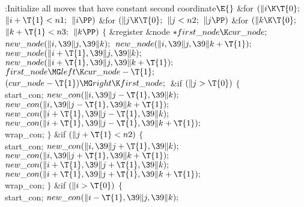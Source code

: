 \B{}:Initialize all moves that have constant second
coordinate\X${}\E{}$\6
\&{for} ${}(\|i\K\T{0};{}$ ${}\|i+\T{1}<\\{n1};{}$ ${}\|i\PP){}$\1\6
\&{for} ${}(\|j\K\T{0};{}$ ${}\|j<\\{n2};{}$ ${}\|j\PP){}$\1\6
\&{for} ${}(\|k\K\T{0};{}$ ${}\|k+\T{1}<\\{n3};{}$ ${}\|k\PP){}$\5
${}\{{}$\1\6
\&{register} \&{node} ${}{*}\\{first\_node}\K\\{cur\_node};{}$\7
${}\\{new\_node}(\|i,\39\|j,\39\|k);{}$\6
${}\\{new\_node}(\|i,\39\|j,\39\|k+\T{1});{}$\6
${}\\{new\_node}(\|i+\T{1},\39\|j,\39\|k);{}$\6
${}\\{new\_node}(\|i+\T{1},\39\|j,\39\|k+\T{1});{}$\6
${}\\{first\_node}\MG\\{left}\K\\{cur\_node}-\T{1};{}$\6
${}(\\{cur\_node}-\T{1})\MG\\{right}\K\\{first\_node};{}$\6
\&{if} ${}(\|j>\T{0}){}$\5
${}\{{}$\1\6
\\{start\_con};\6
${}\\{new\_con}(\|i,\39\|j-\T{1},\39\|k);{}$\6
${}\\{new\_con}(\|i,\39\|j-\T{1},\39\|k+\T{1});{}$\6
${}\\{new\_con}(\|i+\T{1},\39\|j-\T{1},\39\|k);{}$\6
${}\\{new\_con}(\|i+\T{1},\39\|j-\T{1},\39\|k+\T{1});{}$\6
\\{wrap\_con};\6
\4${}\}{}$\2\6
\&{if} ${}(\|j+\T{1}<\\{n2}){}$\5
${}\{{}$\1\6
\\{start\_con};\6
${}\\{new\_con}(\|i,\39\|j+\T{1},\39\|k);{}$\6
${}\\{new\_con}(\|i,\39\|j+\T{1},\39\|k+\T{1});{}$\6
${}\\{new\_con}(\|i+\T{1},\39\|j+\T{1},\39\|k);{}$\6
${}\\{new\_con}(\|i+\T{1},\39\|j+\T{1},\39\|k+\T{1});{}$\6
\\{wrap\_con};\6
\4${}\}{}$\2\6
\&{if} ${}(\|i>\T{0}){}$\5
${}\{{}$\1\6
\\{start\_con};\6
${}\\{new\_con}(\|i-\T{1},\39\|j,\39\|k);{}$\6

